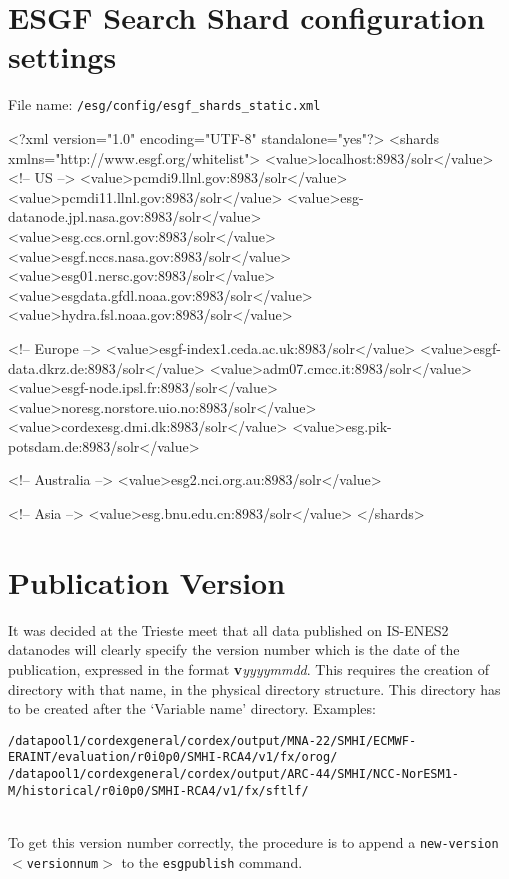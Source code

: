 \section{ESGF Search Shard configuration settings}
File name: \texttt{/esg/config/esgf\_shards\_static.xml}

\begin{tiny}
\begin{verbatimtab}[4]
<?xml version="1.0" encoding="UTF-8" standalone="yes"?>
<shards xmlns="http://www.esgf.org/whitelist">
    <value>localhost:8983/solr</value>
    <!-- US -->
    <value>pcmdi9.llnl.gov:8983/solr</value>
    <value>pcmdi11.llnl.gov:8983/solr</value>
    <value>esg-datanode.jpl.nasa.gov:8983/solr</value>
    <value>esg.ccs.ornl.gov:8983/solr</value>
    <value>esgf.nccs.nasa.gov:8983/solr</value>
    <value>esg01.nersc.gov:8983/solr</value>
    <value>esgdata.gfdl.noaa.gov:8983/solr</value>
    <value>hydra.fsl.noaa.gov:8983/solr</value>
    
    <!-- Europe -->
    <value>esgf-index1.ceda.ac.uk:8983/solr</value>
    <value>esgf-data.dkrz.de:8983/solr</value>
    <value>adm07.cmcc.it:8983/solr</value>
    <value>esgf-node.ipsl.fr:8983/solr</value>
    <value>noresg.norstore.uio.no:8983/solr</value>
    <value>cordexesg.dmi.dk:8983/solr</value>
    <value>esg.pik-potsdam.de:8983/solr</value>
  
    <!-- Australia -->
    <value>esg2.nci.org.au:8983/solr</value>
 
    <!-- Asia -->
   <value>esg.bnu.edu.cn:8983/solr</value>
</shards>

\end{verbatimtab}
\end{tiny}

\section{Publication Version}
It was decided at the Trieste meet that all data published on IS-ENES2 datanodes will clearly specify the version number which is the date of the publication, expressed in the format \textbf{v}\textit{yyyymmdd}. This requires the creation of directory with that name, in the physical directory structure. This directory has to be created after the `Variable name' directory. Examples:\\
\begin{tiny}
\texttt{/datapool1/cordexgeneral/cordex/output/MNA-22/SMHI/ECMWF-ERAINT/evaluation/r0i0p0/SMHI-RCA4/v1/fx/orog/}\\
\texttt{/datapool1/cordexgeneral/cordex/output/ARC-44/SMHI/NCC-NorESM1-M/historical/r0i0p0/SMHI-RCA4/v1/fx/sftlf/}\\
\end{tiny}
\\To get this version number correctly, the procedure is to append a \texttt{\myopt new-version $<$versionnum$>$} to the \texttt{esgpublish} command.

